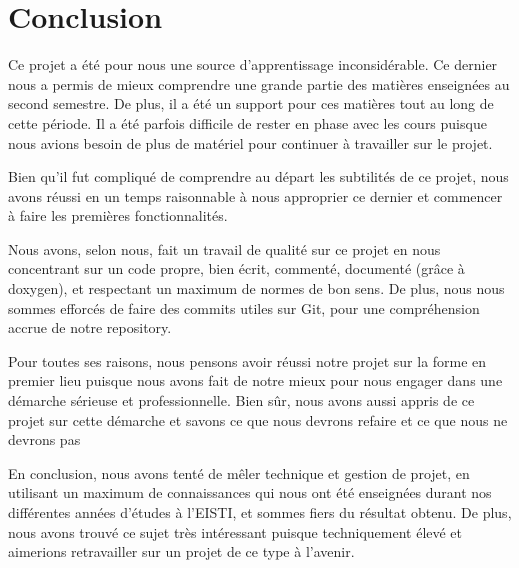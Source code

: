\chapter{Conclusion}

    Ce projet a été pour nous une source d'apprentissage inconsidérable. Ce dernier nous a permis de mieux comprendre une grande partie des matières enseignées au second semestre. De plus, il a été un support pour ces matières tout au long de cette période. Il a été parfois difficile de rester en phase avec les cours puisque nous avions besoin de plus de matériel pour continuer à travailler sur le projet.
    
    Bien qu'il fut compliqué de comprendre au départ les subtilités de ce projet, nous avons réussi en un temps raisonnable à nous approprier ce dernier et commencer à faire les premières fonctionnalités. 
    
    Nous avons, selon nous, fait un travail de qualité sur ce projet en nous concentrant sur un code propre, bien écrit, commenté, documenté (grâce à doxygen), et respectant un maximum de normes de bon sens. De plus, nous nous sommes efforcés de faire des commits utiles sur Git, pour une compréhension accrue de notre repository.
    
    Pour toutes ses raisons, nous pensons avoir réussi notre projet sur la forme en premier lieu puisque nous avons fait de notre mieux pour nous engager dans une démarche sérieuse et professionnelle. Bien sûr, nous avons aussi appris de ce projet sur cette démarche et savons ce que nous devrons refaire et ce que nous ne devrons pas
    
    En conclusion, nous avons tenté de mêler technique et gestion de projet, en utilisant un maximum de connaissances qui nous ont été enseignées durant nos différentes années d'études à l'EISTI, et sommes fiers du résultat obtenu. De plus, nous avons trouvé ce sujet très intéressant puisque techniquement élevé et aimerions retravailler sur un projet de ce type à l'avenir.